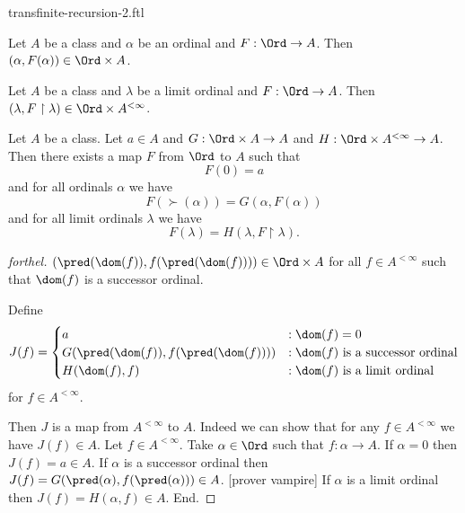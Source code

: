 \documentclass{naproche-library}
\begin{document}
\begin{smodule}[title=Transfinite Recursion II]{transfinite-recursion-2.ftl}
  
\begin{lemma*}[forthel,id=transfinite-recursion_029348573987483]
  Let $A$ be a class and $\alpha$ be an ordinal and $F : \Ord \to A$.
  Then $(\alpha, F(\alpha)) \in \Ord \times A$.
\end{lemma*}

\begin{lemma*}[forthel,id=transfinite-recursion_570293857449281]
  Let $A$ be a class and $\lambda$ be a limit ordinal and $F : \Ord \to A$.
  Then $(\lambda, F \restriction \lambda) \in \Ord \times A^{< \infty}$.
\end{lemma*}

\begin{corollary*}[forthel,id=transfinite-recursion_298647309184593]
  Let $A$ be a class.
  Let $a \in A$ and $G : \Ord \times A \to A$ and $H : \Ord \times A^{< \infty} \to A$.
  Then there exists a map $F$ from $\Ord$ to $A$ such that
  \[ F(0) = a \]
  and for all ordinals $\alpha$ we have
  \[ F(\succ(\alpha)) = G(\alpha, F(\alpha)) \]
  and for all limit ordinals $\lambda$ we have
  \[ F(\lambda) = H(\lambda, F \restriction \lambda). \]
\end{corollary*}
\begin{proof}[forthel]
  $(\pred(\dom(f)), f(\pred(\dom(f)))) \in \Ord \times A$ for all $f \in A^{< \infty}$ such that $\dom(f)$ is a successor ordinal.

  Define  \[ J(f) =
    \begin{cases}
      a
      & : \dom(f) = 0
      \\
      G(\pred(\dom(f)), f(\pred(\dom(f))))
      & : \text{$\dom(f)$ is a successor ordinal}
      \\
      H(\dom(f), f)
      & : \text{$\dom(f)$ is a limit ordinal}
    \end{cases} \]
  for $f \in A^{< \infty}$.

  Then $J$ is a map from $A^{< \infty}$ to $A$.
  Indeed we can show that for any $f \in A^{< \infty}$ we have $J(f) \in A$.
    Let $f \in A^{< \infty}$.
    Take $\alpha \in \Ord$ such that $f : \alpha \to A$.
    If $\alpha = 0$ then $J(f) = a \in A$.
    If $\alpha$ is a successor ordinal then $J(f) =
    G(\pred(\alpha), f(\pred(\alpha))) \in A$.
    [prover vampire]
    If $\alpha$ is a limit ordinal then $J(f) = H(\alpha, f) \in A$.
  End.


\end{proof}
\end{smodule}
\end{document}
